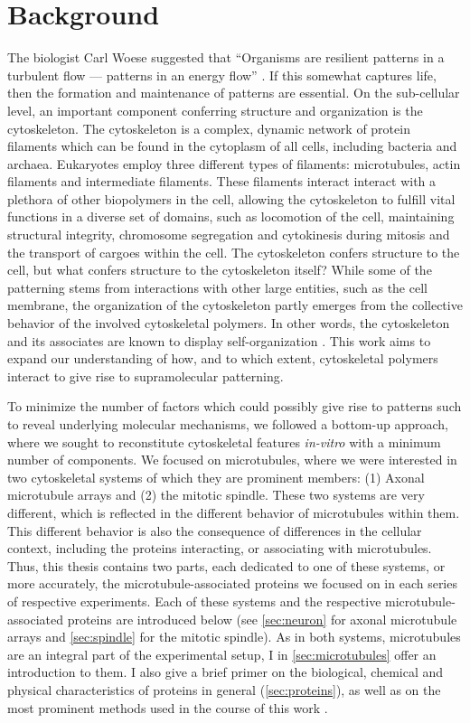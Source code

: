 \chapter{Background}
The biologist Carl Woese suggested that “Organisms are resilient patterns in a turbulent flow — patterns in an energy flow” \parencite{Woese}. If this somewhat captures life, then the formation and maintenance of patterns are essential. On the sub-cellular level, an important component conferring structure and organization is the cytoskeleton. The cytoskeleton is a complex, dynamic network of protein filaments which can be found in the cytoplasm of all cells, including bacteria and archaea. Eukaryotes employ three different types of filaments: microtubules, actin filaments and intermediate filaments. These filaments interact interact with a plethora of other biopolymers in the cell, allowing the cytoskeleton to fulfill vital functions in a diverse set of domains, such as locomotion of the cell, maintaining structural integrity, chromosome segregation and cytokinesis during mitosis and the transport of cargoes within the cell. The cytoskeleton confers structure to the cell, but what confers structure to the cytoskeleton itself? While some of the patterning stems from interactions with other large entities, such as the cell membrane, the organization of the cytoskeleton partly emerges from the collective behavior of the involved cytoskeletal polymers. In other words, the cytoskeleton and its associates are known to display self-organization \parencite{Karsenti2008}. This work aims to expand our understanding of how, and to which extent, cytoskeletal polymers interact to give rise to supramolecular patterning. \par
To minimize the number of factors which could possibly give rise to patterns such to reveal underlying molecular mechanisms, we followed a bottom-up approach, where we sought to reconstitute cytoskeletal features \textit{in-vitro} with a minimum number of components. We focused on microtubules, where we were interested in two cytoskeletal systems of which they are prominent members: (1) Axonal microtubule arrays and (2) the mitotic spindle. These two systems are very different, which is reflected in the different behavior of microtubules within them. This different behavior is also the consequence of differences in the cellular context, including the proteins interacting, or associating with microtubules. Thus, this thesis contains two parts, each dedicated to one of these systems, or more accurately, the microtubule-associated proteins we focused on in each series of respective experiments. Each of these systems and the respective microtubule-associated proteins are introduced below (see \autoref{sec:neuron} for axonal microtubule arrays and \autoref{sec:spindle} for the mitotic spindle). As in both systems, microtubules are an integral part of the experimental setup, I in \autoref{sec:microtubules} offer an introduction to them. I also give a brief primer on the biological, chemical and physical characteristics of proteins in general (\autoref{sec:proteins}), as well as on the most prominent methods used in the course of this work .

